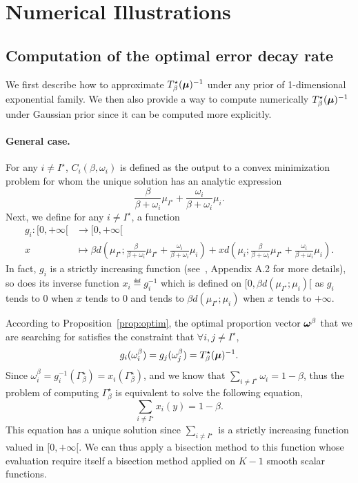\section{Numerical Illustrations}\label{sec:t3c.experiments}

\subsection{Computation of the optimal error decay rate}\label{sec:t3c.experiments.rate}

We first describe how to approximate $T_{\beta}^\star({\boldsymbol \mu})^{-1}$ under any prior of 1-dimensional exponential family. We then also provide a way to compute numerically $T_{\beta}^\star({\boldsymbol \mu})^{-1}$ under Gaussian prior since it can be computed more explicitly.

\paragraph{General case.}
For any $i\neq I^\star$, $C_i(\beta,\omega_i)$ is defined as the output to a convex minimization problem for whom the unique solution has an analytic expression
\[
    \frac{\beta}{\beta+\omega_i}\mu_{I^\star} + \frac{\omega_i}{\beta+\omega_i}\mu_i.
\]
Next, we define for any $i\neq I^\star$, a function
\begin{align*}
  g_i \colon [0,+\infty[ &\to [0,+\infty[\\
  x &\mapsto \beta d\left(\mu_{I^\star};\frac{\beta}{\beta+\omega_i}\mu_{I^\star} + \frac{\omega_i}{\beta+\omega_i}\mu_i\right) + x d\left(\mu_i;\frac{\beta}{\beta+\omega_i}\mu_{I^\star} + \frac{\omega_i}{\beta+\omega_i}\mu_i\right).
\end{align*}
In fact, $g_i$ is a strictly increasing function (see~\citealt{garivier2016tracknstop}, Appendix A.2 for more details), so does its inverse function $x_i \eqdef g_i^{-1}$ which is defined on $[0, \beta d(\mu_{I^\star};\mu_i)[$ as $g_i$ tends to 0 when $x$ tends to 0 and tends to $\beta d(\mu_{I^\star};\mu_i)$ when $x$ tends to $+\infty$.

According to Proposition~\ref{prop:optim}, the optimal proportion vector ${\boldsymbol \omega}^\beta$ that we are searching for satisfies the constraint that $\forall i,j\neq I^\star$,
\[
    g_i(\omega_i^\beta) = g_j(\omega_j^\beta) = T_{\beta}^\star({\boldsymbol \mu})^{-1}.
\]
Since $\omega_i^\beta = g_i^{-1}(\Gamma_{\beta}^\star) = x_i(\Gamma_{\beta}^\star)$, and we know that $\sum_{i\neq I^\star} \omega_i = 1-\beta$, thus the problem of computing $\Gamma_{\beta}^\star$ is equivalent to solve the following equation,
\[
    \sum_{i\neq I^\star} x_i(y) = 1 - \beta.
\]
This equation has a unique solution since $\sum_{i\neq I^\star}$ is a strictly increasing function valued in $[0, +\infty[$. We can thus apply a bisection method to this function whose evaluation require itself a bisection method applied on $K-1$ smooth scalar functions.

